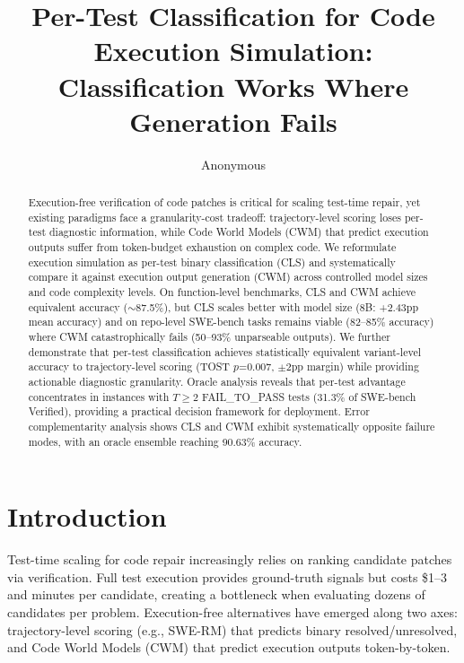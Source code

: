 \documentclass[11pt,a4paper]{article}
\title{Per-Test Classification for Code Execution Simulation:\\Classification Works Where Generation Fails}
\author{Anonymous}
\date{}
\begin{document}
\maketitle

\begin{abstract}
Execution-free verification of code patches is critical for scaling test-time repair, yet existing paradigms face a granularity-cost tradeoff: trajectory-level scoring loses per-test diagnostic information, while Code World Models (CWM) that predict execution outputs suffer from token-budget exhaustion on complex code. We reformulate execution simulation as per-test binary classification (CLS) and systematically compare it against execution output generation (CWM) across controlled model sizes and code complexity levels. On function-level benchmarks, CLS and CWM achieve equivalent accuracy ($\sim$87.5\%), but CLS scales better with model size (8B: +2.43pp mean accuracy) and on repo-level SWE-bench tasks remains viable (82--85\% accuracy) where CWM catastrophically fails (50--93\% unparseable outputs). We further demonstrate that per-test classification achieves statistically equivalent variant-level accuracy to trajectory-level scoring (TOST $p$=0.007, $\pm$2pp margin) while providing actionable diagnostic granularity. Oracle analysis reveals that per-test advantage concentrates in instances with $T\geq2$ FAIL\_TO\_PASS tests (31.3\% of SWE-bench Verified), providing a practical decision framework for deployment. Error complementarity analysis shows CLS and CWM exhibit systematically opposite failure modes, with an oracle ensemble reaching 90.63\% accuracy.
\end{abstract}

\section{Introduction}

Test-time scaling for code repair increasingly relies on ranking candidate patches via verification. Full test execution provides ground-truth signals but costs \$1--3 and minutes per candidate, creating a bottleneck when evaluating dozens of candidates per problem. Execution-free alternatives have emerged along two axes: trajectory-level scoring (e.g., SWE-RM) that predicts binary resolved/unresolved, and Code World Models (CWM) that predict execution outputs token-by-token.
\end{document}
